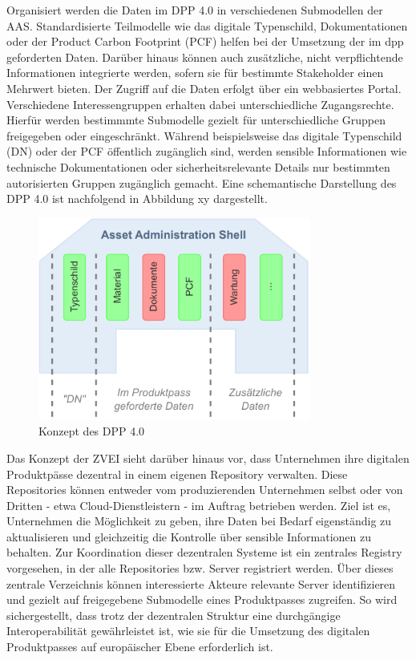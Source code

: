 Organisiert werden die Daten im DPP 4.0 in verschiedenen Submodellen der AAS. 
Standardisierte Teilmodelle wie das digitale Typenschild, Dokumentationen oder der Product Carbon Footprint (PCF) helfen bei der Umsetzung der im \acs{dpp} geforderten Daten.
Darüber hinaus können auch zusätzliche, nicht verpflichtende Informationen integrierte werden, sofern sie für bestimmte Stakeholder einen Mehrwert bieten.
Der Zugriff auf die Daten erfolgt über ein webbasiertes Portal. Verschiedene Interessengruppen erhalten dabei unterschiedliche Zugangsrechte. 
Hierfür werden bestimmmte Submodelle gezielt für unterschiedliche Gruppen freigegeben oder eingeschränkt.
Während beispielsweise das digitale Typenschild (DN) oder der PCF öffentlich zugänglich sind, werden sensible Informationen wie technische Dokumentationen oder sicherheitsrelevante Details nur bestimmten autorisierten Gruppen zugänglich gemacht.
Eine schemantische Darstellung des DPP 4.0 ist nachfolgend in Abbildung xy dargestellt.

\vspace{1em}
\begin{figure}[htbp]
    \centering
    \includegraphics[width=0.8\textwidth]{Bilder/dpp_konzept.pdf}
    \caption{Konzept des DPP 4.0}
    \label{fig:klassifizierungDT}
\end{figure}

Das Konzept der ZVEI sieht darüber hinaus vor, dass Unternehmen ihre digitalen Produktpässe dezentral in einem eigenen Repository verwalten. 
Diese Repositories können entweder vom produzierenden Unternehmen selbst oder von Dritten - etwa Cloud-Dienstleistern - im Auftrag betrieben werden. 
Ziel ist es, Unternehmen die Möglichkeit zu geben, ihre Daten bei Bedarf eigenständig zu aktualisieren und gleichzeitig die Kontrolle über sensible Informationen zu behalten.
Zur Koordination dieser dezentralen Systeme ist ein zentrales Registry vorgesehen, in der alle Repositories bzw. Server registriert werden.
Über dieses zentrale Verzeichnis können interessierte Akteure relevante Server identifizieren und gezielt auf freigegebene Submodelle eines Produktpasses zugreifen.
So wird sichergestellt, dass trotz der dezentralen Struktur eine durchgängige Interoperabilität gewährleistet ist, wie sie für die Umsetzung des digitalen Produktpasses auf europäischer Ebene erforderlich ist.

